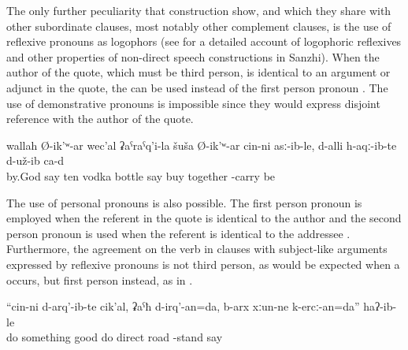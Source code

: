 The only further peculiarity that  construction show, and which they share with other subordinate clauses, most notably other complement clauses, is the use of reflexive pronouns as logophors (see \citealp{ForkerSubmittedb} for a detailed account of logophoric reflexives and other properties of non-direct speech constructions in Sanzhi). When the author of the quote, which must be third person, is identical to an argument or adjunct in the quote, the  can be used instead of the first person pronoun . The use of demonstrative pronouns is impossible since they would express disjoint reference with the author of the quote.
%
\begin{exe}
	\ex	\label{ex:‎‎‎By God, he said that he himself had bought 10 bottles of vodka; and apparently he had brought them with him}
	\gll	wallah		Ø-ik'ʷ-ar	wec'al	ʡaˁraˁq'i-la	šuša	Ø-ik'ʷ-ar	cin-ni	asː-ib-le,	d-alli	h-aqː-ib-te	d-už-ib	ca-d	\\
		by.God say	ten	vodka	bottle	say		buy	together	-carry 	be	\\
	\glt	{}
\end{exe}

The use of personal pronouns is also possible. The first person pronoun is employed when the referent in the quote is identical to the author  and the second person pronoun is used when the referent is identical to the addressee . Furthermore, the agreement on the verb in clauses with subject-like arguments expressed by reflexive pronouns is not third person, as would be expected when a  occurs, but first person instead, as in .
%
\begin{exe}
	\ex	\label{ex:‎(He said,) The things that I have done, I will repair (make better), I will be on the right road}
	\gll	``cin-ni	d-arq'-ib-te	cik'al,	ʡaˁħ	d-irq'-an=da,	b-arx	xːun-ne	k-ercː-an=da''	haʔ-ib-le\\
			do something	good	do	direct	road	-stand	say\\
	\glt	{}
\end{exe}

